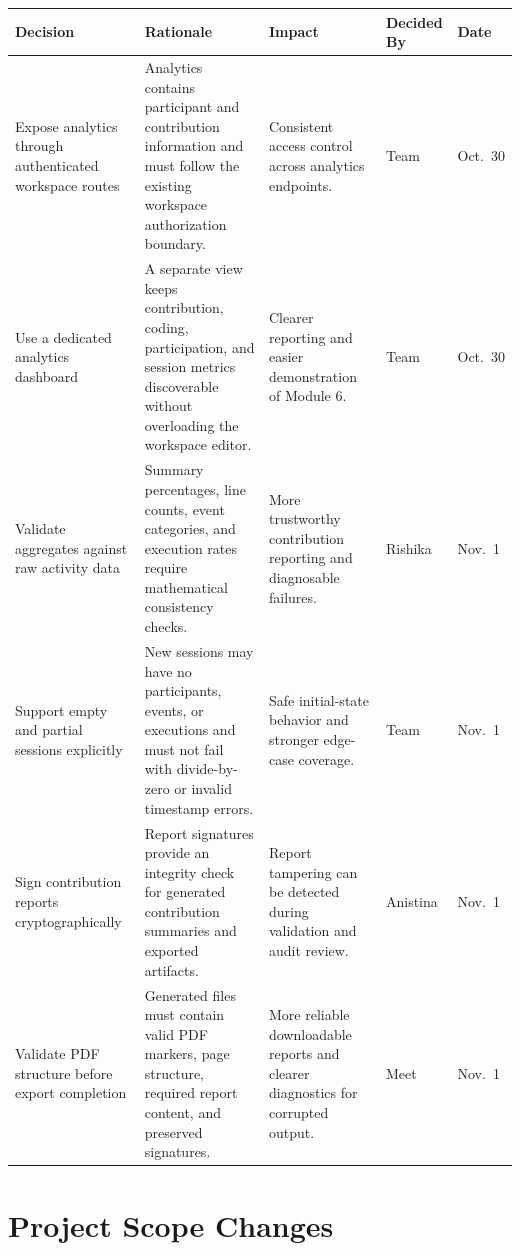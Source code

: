 \documentclass[11pt,a4paper]{article}
\begin{document}
\begin{table}[htbp]
\centering
\small
\begin{tabularx}{\textwidth}{>{\raggedright\arraybackslash}p{2.5cm}
                Y
                >{\raggedright\arraybackslash}p{3.1cm}
                >{\centering\arraybackslash}p{1.6cm}
                >{\centering\arraybackslash}p{1.2cm}}
\toprule
\textbf{Decision} & \textbf{Rationale} & \textbf{Impact} & \textbf{Decided By} & \textbf{Date} \\
\midrule
Expose analytics through authenticated workspace routes & Analytics contains participant and contribution information and must follow the existing workspace authorization boundary. & Consistent access control across analytics endpoints. & Team & Oct.\ 30 \\
Use a dedicated analytics dashboard & A separate view keeps contribution, coding, participation, and session metrics discoverable without overloading the workspace editor. & Clearer reporting and easier demonstration of Module 6. & Team & Oct.\ 30 \\
Validate aggregates against raw activity data & Summary percentages, line counts, event categories, and execution rates require mathematical consistency checks. & More trustworthy contribution reporting and diagnosable failures. & Rishika & Nov.\ 1 \\
Support empty and partial sessions explicitly & New sessions may have no participants, events, or executions and must not fail with divide-by-zero or invalid timestamp errors. & Safe initial-state behavior and stronger edge-case coverage. & Team & Nov.\ 1 \\
Sign contribution reports cryptographically & Report signatures provide an integrity check for generated contribution summaries and exported artifacts. & Report tampering can be detected during validation and audit review. & Anistina & Nov.\ 1 \\
Validate PDF structure before export completion & Generated files must contain valid PDF markers, page structure, required report content, and preserved signatures. & More reliable downloadable reports and clearer diagnostics for corrupted output. & Meet & Nov.\ 1 \\
\bottomrule
\end{tabularx}
\end{table}

\section{Project Scope Changes}
\end{document}
